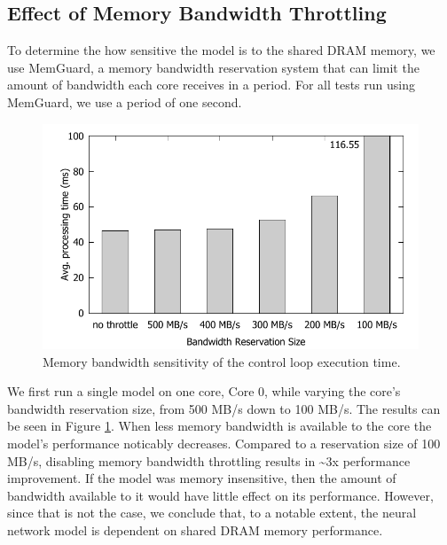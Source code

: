 \subsection{Effect of Memory Bandwidth Throttling}

To determine the how sensitive the model is to the shared DRAM 
memory, we use MemGuard\cite{yun2014rtas}, a memory bandwidth reservation system that 
can limit the amount of bandwidth each core receives in a period. For 
all tests run using MemGuard, we use a period of one second. 

\begin{figure}[h]
  \centering
  \includegraphics[width=.45\textwidth]{figs/memguard_multicore}
  \caption{ Memory bandwidth sensitivity of the control loop 
execution time. }
  \label{fig:memguard_multicore}
\end{figure}

We first run a single model on one core, Core 0, while varying the 
core's bandwidth reservation size, from 500 MB/s down to 100 MB/s. 
The results can be seen in Figure \ref{fig:memguard_multicore}. When less 
memory bandwidth is available to the core the model's performance 
noticably decreases.
Compared to a reservation size of 100 
MB/s, disabling memory bandwidth throttling results in 
\textasciitilde3x performance improvement. If the model was memory 
insensitive, then the amount of bandwidth available to it would have 
little effect on its performance. However, since that is not the 
case, we conclude that, to a notable extent, the neural network model 
is dependent on shared DRAM memory performance.



